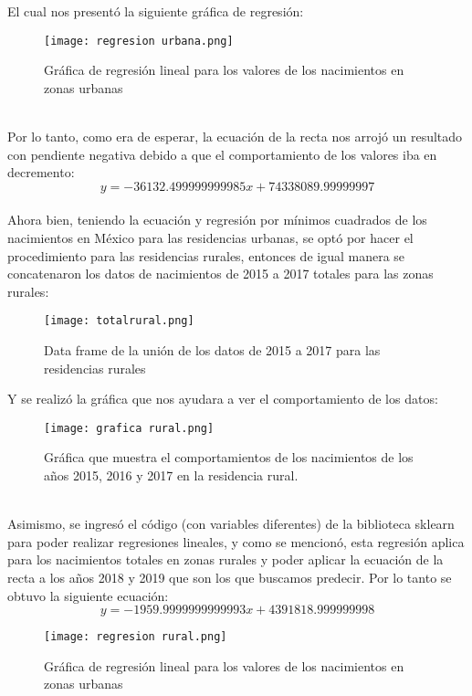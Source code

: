 \documentclass{article}
\begin{document}
El cual nos presentó la siguiente gráfica de regresión:
\begin{figure}[h]
    \centering
    \texttt{[image: regresion urbana.png]}
    \caption{Gráfica de regresión lineal para los valores de los nacimientos en zonas urbanas}
    \label{fig:my_label}
\end{figure}\\
Por lo tanto, como era de esperar, la ecuación de la recta nos arrojó un resultado con pendiente negativa debido a que el comportamiento de los valores iba en decremento: 
\begin{equation}\tag{2}\label{2}
    y=-36132.499999999985x+74338089.99999997
\end{equation}\\
Ahora bien, teniendo la ecuación y regresión por mínimos cuadrados de los nacimientos en México para las residencias urbanas, se optó por hacer el procedimiento para las residencias rurales, entonces de igual manera se concatenaron los datos de nacimientos de 2015 a 2017 totales para las zonas rurales: 
\begin{figure}[h]
    \centering
    \texttt{[image: totalrural.png]}
    \caption{Data frame de la unión de los datos de 2015 a 2017 para las residencias rurales}
    \label{fig:my_label}
\end{figure}
Y se realizó la gráfica que nos ayudara a ver el comportamiento de los datos:
\begin{figure}[h]
    \centering
    \texttt{[image: grafica rural.png]}
    \caption{Gráfica que muestra el comportamientos de los nacimientos de los años 2015, 2016 y 2017 en la residencia rural.}
    \label{fig:my_label}
\end{figure}\\
Asimismo, se ingresó el código (con variables diferentes) de la biblioteca sklearn para poder realizar regresiones lineales, y como se mencionó, esta regresión aplica para los nacimientos totales en zonas rurales y poder aplicar la ecuación de la recta a los años 2018 y 2019 que son los que buscamos predecir. Por lo tanto se obtuvo la siguiente ecuación: 
\begin{equation}
    y=-1959.9999999999993x+4391818.999999998
\end{equation}

\begin{figure}[h]
    \centering
    \texttt{[image: regresion rural.png]}
    \caption{Gráfica de regresión lineal para los valores de los nacimientos en zonas urbanas}
    \label{fig:my_label}
\end{figure}\\
\end{document}
